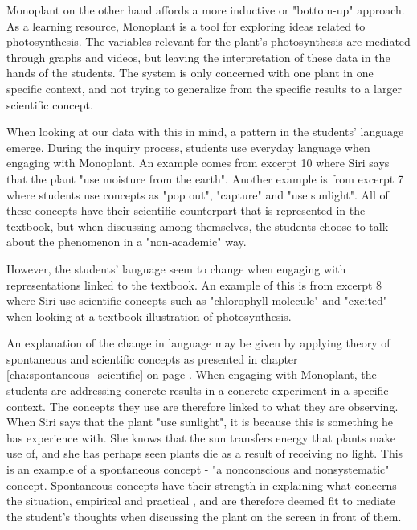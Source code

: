 Monoplant on the other hand affords a more inductive or "bottom-up" approach. As a learning resource, Monoplant is a tool for exploring ideas related to photosynthesis. The variables relevant for the plant's photosynthesis are mediated through graphs and videos, but leaving the interpretation of these data in the hands of the students. The system is only concerned with one plant in one specific context, and not trying to generalize from the specific results to a larger scientific concept. 

When looking at our data with this in mind, a pattern in the students' language emerge. During the inquiry process, students use everyday language when engaging with Monoplant. An example comes from excerpt 10 where Siri says that the plant "use moisture from the earth". Another example is from excerpt 7 where students use concepts as "pop out", "capture" and "use sunlight". All of these concepts have their scientific counterpart that is represented in the textbook, but when discussing among themselves, the students choose to talk about the phenomenon in a "non-academic" way. 

However, the students' language seem to change when engaging with representations linked to the textbook. An example of this is from excerpt 8 where Siri use scientific concepts such as "chlorophyll molecule" and "excited" when looking at a textbook illustration of photosynthesis. 

An explanation of the change in language may be given by applying \citet{vygotsky2012thought} theory of spontaneous and scientific concepts as presented in chapter \ref{cha:spontaneous_scientific} on page \pageref{cha:spontaneous_scientific}. When engaging with Monoplant, the students are addressing concrete results in a concrete experiment in a specific context. The concepts they use are therefore linked to what they are observing. When Siri says that the plant "use sunlight", it is because this is something he has experience with. She knows that the sun transfers energy that plants make use of, and she has perhaps seen plants die as a result of receiving no light. This is an example of a spontaneous concept \citep{vygotsky2012thought} - "a nonconscious and nonsystematic" concept. Spontaneous concepts have their strength in explaining what concerns the situation, empirical and practical \citep{vygotsky2012thought}, and are therefore deemed fit to mediate the student's thoughts when discussing the plant on the screen in front of them. 

